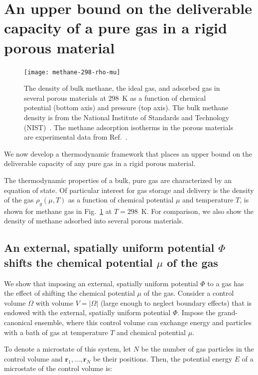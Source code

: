 \documentclass[twoside,twocolumn,9pt]{article}
\newcommand\V{\Phi}
\begin{document}
\section{An upper bound on the deliverable capacity of a pure gas in a rigid porous material}\label{sec:upper-bound}
\begin{figure}
  \centering
  \texttt{[image: methane-298-rho-mu]}
  \caption{The density of bulk methane, the ideal gas, and adsorbed gas in several porous materials at 298\ K as a function of chemical potential (bottom axis) and pressure (top axis). The bulk methane density is from the National Institute of Standards and Technology (NIST)~\cite{nist}. The methane adsorption isotherms in the porous materials are experimental data from Ref.~\cite{mason2014evaluating, furukawa2009storage}.
  }
  \label{fig:density-vs-mu-ch4}
\end{figure}

We now develop a thermodynamic framework that places an upper bound on the deliverable capacity of any pure gas in a rigid porous material.

The thermodynamic properties of a bulk, pure gas are characterized by an
equation of state. Of particular interest for gas storage and delivery is the
density of the gas $\rho_g(\mu,T)$ as a function of chemical potential $\mu$
and temperature $T$, is shown for methane gas in
Fig.~\ref{fig:density-vs-mu-ch4} at $T=298$\ K. For comparison, we also show
the density of methane adsorbed into several porous materials.

\subsection{An external, spatially uniform potential $\V$ shifts the chemical potential $\mu$ of the gas} \label{sec:V_shifts_chem_pot}
We show that imposing an external, spatially uniform potential $\V$ to a gas
has the effect of shifting the chemical potential $\mu$ of the gas. Consider a control volume $\Omega$ with volume
$V=|\Omega|$ (large enough to neglect boundary effects) that is endowed with
the external, spatially uniform potential $\V$. Impose the grand-canonical
ensemble, where this control volume can exchange energy and particles with a
bath of gas at temperature $T$ and chemical potential $\mu$.

To denote a microstate of this system, let $N$ be the number of gas particles
in the control volume and $\mathbf{r}_1,...,\mathbf{r}_N$ be their positions.
Then, the potential energy $E$ of a microstate of the control volume is:
\end{document}
